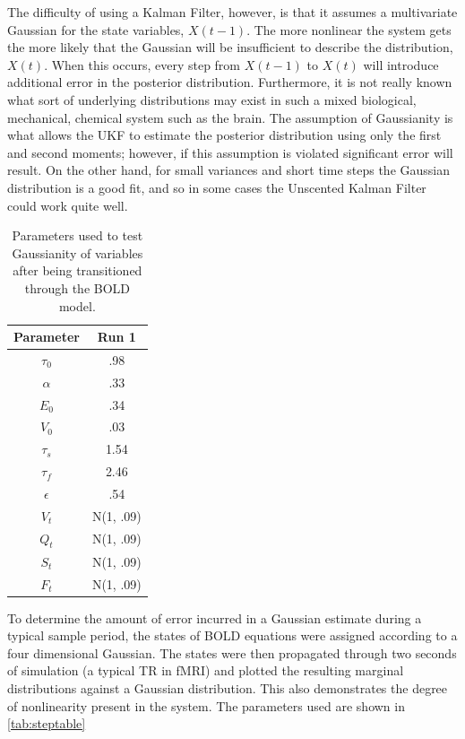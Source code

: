 The difficulty
of using a Kalman Filter, however, is that it assumes a multivariate 
Gaussian for the state variables, $X(t-1)$. The more nonlinear the system
gets the more likely that the Gaussian will be insufficient to describe
the distribution, $X(t)$. When this occurs, every step from  $X(t-1)$ 
to $X(t)$ will introduce additional
error in the posterior distribution. Furthermore, it is not really known what 
sort of underlying distributions may exist in such a mixed biological,
mechanical, chemical system such as the brain.
 The assumption of Gaussianity is what allows
the \ac{UKF} to estimate the posterior distribution using only the 
first and second moments;
however, if this assumption is violated significant error will result.
 On the other hand, for
small variances and short time steps the Gaussian distribution is a good 
fit, and so in some cases the Unscented Kalman Filter could work quite
well. 
\begin{table}[t]
\centering
\begin{tabular}{|c || c |}
\hline 
Parameter & Run 1 \\
\hline
$\tau_0$ & .98  \\
$\alpha$ & .33 \\
$E_0$ & .34  \\
$V_0$ & .03  \\
$\tau_s$ & 1.54  \\
$\tau_f$ & 2.46  \\
$\epsilon$ & .54  \\
$V_t$ & N(1, .09)  \\
$Q_t$ & N(1, .09)  \\
$S_t$ & N(1, .09) \\
$F_t$ & N(1, .09) \\
\hline
\end{tabular}
\caption{Parameters used to test Gaussianity of variables after being transitioned through
the \ac{BOLD} model.}
\label{tab:steptable} 
\end{table}

To determine the amount of error incurred in a Gaussian estimate during
a typical sample period, the states of \ac{BOLD} equations were assigned according
to a four dimensional Gaussian. The states were then propagated through 
two seconds of simulation (a typical \ac{TR} in \ac{fMRI}) and plotted the resulting
marginal distributions against a Gaussian distribution. This also demonstrates
the degree of nonlinearity present in the system. The parameters used are 
shown in \autoref{tab:steptable}

